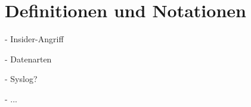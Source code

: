 \section{Definitionen und Notationen}

\label{sec_basics_definitions}

- Insider-Angriff

- Datenarten

- Syslog?

- ...